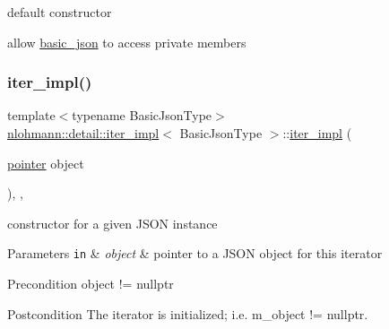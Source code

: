 default constructor 

allow \mbox{\hyperlink{classnlohmann_1_1basic__json}{basic\+\_\+json}} to access private members \mbox{\label{classnlohmann_1_1detail_1_1iter__impl_a88a00484ac201c52fc5f613d88a2918b}} 
\subsubsection{\texorpdfstring{iter\+\_\+impl()}{iter\_impl()}\hspace{0.1cm}{\footnotesize\ttfamily [2/4]}}
{\footnotesize\ttfamily template$<$typename Basic\+Json\+Type$>$ \\
\mbox{\hyperlink{classnlohmann_1_1detail_1_1iter__impl}{nlohmann\+::detail\+::iter\+\_\+impl}}$<$ Basic\+Json\+Type $>$\+::\mbox{\hyperlink{classnlohmann_1_1detail_1_1iter__impl}{iter\+\_\+impl}} (\begin{DoxyParamCaption}\item[{\mbox{\hyperlink{classnlohmann_1_1detail_1_1iter__impl_a69e52f890ce8c556fd68ce109e24b360}{pointer}}}]{object }\end{DoxyParamCaption})\hspace{0.3cm}{\ttfamily [inline]}, {\ttfamily [explicit]}, {\ttfamily [noexcept]}}



constructor for a given J\+S\+ON instance 


\begin{DoxyParams}[1]{Parameters}
\mbox{\tt in}  & {\em object} & pointer to a J\+S\+ON object for this iterator \\
\hline
\end{DoxyParams}
\begin{DoxyPrecond}{Precondition}
object != nullptr 
\end{DoxyPrecond}
\begin{DoxyPostcond}{Postcondition}
The iterator is initialized; i.\+e. {\ttfamily m\+\_\+object != nullptr}. 
\end{DoxyPostcond}
\mbox{\label{classnlohmann_1_1detail_1_1iter__impl_a71f84fb6e009619f12972bcf9002b8cd}} 
